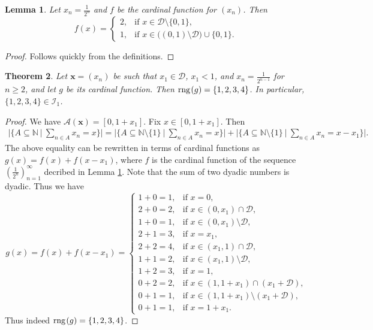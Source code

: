 \documentclass{amsart}
\newtheorem{theorem}{Theorem}[section]
\newtheorem{lemma}[theorem]{Lemma}
\theoremstyle{definition}
\newcommand{\rng}{{\rm rng} \hspace{0.03cm}}
\begin{document}
\begin{lemma}\label{lematdodwojkowych}
Let $x_n=\frac{1}{2^n}$ and $f$ be the cardinal function for $(x_n)$. Then 
\begin{displaymath}
f(x) = \left\{ \begin{array}{ll} 2, & \textrm{if $x\in  \mathcal{D}\setminus\{0,1\}$,}\\ 1, & \textrm{if $x\in \big((0,1)\setminus \mathcal{D}\big)\cup\{0,1\}$.} \end{array} \right.
\end{displaymath}
\end{lemma}
\begin{proof}
Follows quickly from the definitions.
\end{proof}


\begin{theorem}\label{dwojkowowymierna}
Let $\mathbf{x}=(x_{n})$ be such that $x_{1}\in\mathcal{D}$, $x_{1}<1$, and $x_{n}=\frac{1}{2^{n-1}}$ for $n\geq 2$, and let $g$ be its cardinal function. Then $\rng (g)=\{1,2,3,4\}$. In particular, $\{1,2,3,4\}\in \mathcal{I}_1$.
\end{theorem}
\begin{proof}
We have $\mathcal{A}(\textbf{x})=[0,1+x_1]$. Fix $x\in[0,1+x_1]$. Then
\begin{align*}
\bigg|\bigg\{ A\subseteq \mathbb{N}\ \bigg|\ \sum_{n\in A} x_n =x \bigg\}\bigg|= \bigg|\bigg\{ A\subseteq \mathbb{N}\setminus\{1\}\ \bigg|\ \sum_{n\in A} x_n =x \bigg\}\bigg| + \bigg|\bigg\{ A\subseteq \mathbb{N}\setminus\{1\}\ \bigg|\ \sum_{n\in A} x_n =x-x_1  \bigg\}\bigg|.
\end{align*}
The above equality can be rewritten in terms of cardinal functions as $g(x)=f(x)+f(x-x_1)$, where $f$ is the cardinal function of the sequence $\left(\frac{1}{2^{n}}\right)_{n=1}^{\infty}$ decribed in Lemma \ref{lematdodwojkowych}. Note that the sum of two dyadic numbers is dyadic. Thus we have
\begin{displaymath}
g(x) = f(x)+f(x-x_1)= \left\{ \begin{array}{ll} 
1+0=1, & \textrm{if $x=0$,}\\ 
2+0=2, & \textrm{if $x\in(0,x_1)\cap \mathcal{D}$,}\\ 
1+0=1, & \textrm{if $x\in(0,x_1)\setminus \mathcal{D}$,} \\ 
2+1=3, & \textrm{if $x=x_1$,}\\ 
2+2=4, & \textrm{if $x\in (x_1,1)\cap \mathcal{D}$,}\\ 
1+1=2, & \textrm{if $x\in (x_1,1)\setminus \mathcal{D}$,}\\ 
1+2=3, & \textrm{if $x=1$,}\\ 
0+2=2, & \textrm{if $x\in (1,1+x_1)\cap (x_1+\mathcal{D})$,}\\ 
0+1=1, & \textrm{if $x\in (1,1+x_1)\setminus (x_1+\mathcal{D})$,}\\ 
0+1=1, & \textrm{if $x=1+x_1$.}\end{array} \right.
\end{displaymath}
Thus indeed $\rng (g)=\{1,2,3,4\}$.
\end{proof}
\end{document}
